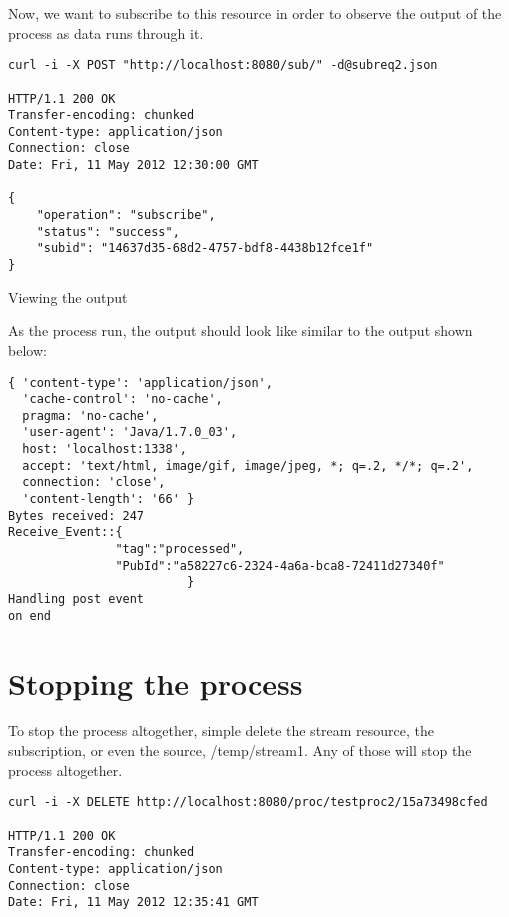 Now, we want to subscribe to this resource in order to observe the output of the process as data runs through it.

\begin{lstlisting}
curl -i -X POST "http://localhost:8080/sub/" -d@subreq2.json

HTTP/1.1 200 OK
Transfer-encoding: chunked
Content-type: application/json
Connection: close
Date: Fri, 11 May 2012 12:30:00 GMT

{
    "operation": "subscribe",
    "status": "success",
    "subid": "14637d35-68d2-4757-bdf8-4438b12fce1f"
}
\end{lstlisting}
Viewing the output

As the process run, the output should look like similar to the output shown below:

\begin{lstlisting}
{ 'content-type': 'application/json',
  'cache-control': 'no-cache',
  pragma: 'no-cache',
  'user-agent': 'Java/1.7.0_03',
  host: 'localhost:1338',
  accept: 'text/html, image/gif, image/jpeg, *; q=.2, */*; q=.2',
  connection: 'close',
  'content-length': '66' }
Bytes received: 247
Receive_Event::{
               "tag":"processed",
               "PubId":"a58227c6-2324-4a6a-bca8-72411d27340f"
                         }
Handling post event
on end
\end{lstlisting}

\section{Stopping the process}

To stop the process altogether, simple delete the stream resource, the subscription, or even the source, /temp/stream1. Any of those will stop the process altogether.

\begin{lstlisting}
curl -i -X DELETE http://localhost:8080/proc/testproc2/15a73498cfed

HTTP/1.1 200 OK
Transfer-encoding: chunked
Content-type: application/json
Connection: close
Date: Fri, 11 May 2012 12:35:41 GMT
\end{lstlisting}
